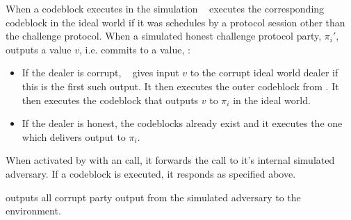 When a codeblock executes in the simulation \Ssyncbracha~ executes the corresponding codeblock in the ideal world if it was schedules by a protocol session other than the challenge protocol.
When a simulated honest challenge protocol party, $\pi_i'$, outputs a value $v$, i.e. commits to a value, \Ssyncbracha:
\begin{itemize}
\item If the dealer is corrupt, \Ssyncbracha~ gives input $v$ to the corrupt ideal world dealer if this is the first such output. It then executes the outer codeblock from \Fbracha. It then executes the codeblock that outputs $v$ to $\pi_i$ in the ideal world.
\item If the dealer is honest, the codeblocks already exist and it executes the one which delivers output to $\pi_i$.
\end{itemize}

When activated by \Environment with an \Exec call, it forwards the call to it's internal simulated adversary. If a codeblock is executed, it responds as specified above. 

\Ssyncbracha outputs all corrupt party output from the simulated adversary to the environment.
